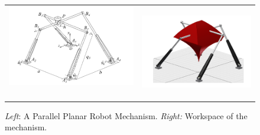 \begin{figure}[tb!]
	\centering
	\begin{tabular}{@{}c@{}c@{}}
	\includegraphics[width=0.50\linewidth ,height=0.4\columnwidth]{figures/parallel_translational.png} \,\,
	&
	\includegraphics[width=0.48\columnwidth,height=0.4\columnwidth]{figures/parallel_translational_workspace.png}
	\end{tabular}
	\caption{\textit{Left}: A Parallel Planar Robot Mechanism. \textit{Right:} Workspace of the mechanism.}
	\label{fig:para_mech}
\end{figure}